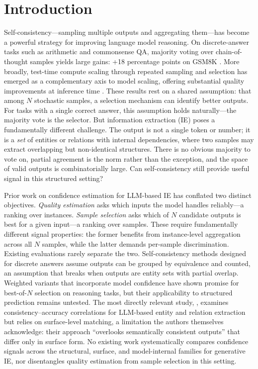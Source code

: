 \section{Introduction}\label{sec:introduction}

Self-consistency---sampling multiple outputs and aggregating them---has become a powerful strategy for improving language model reasoning.
On discrete-answer tasks such as arithmetic and commonsense QA, majority voting over chain-of-thought samples yields large gains: +18 percentage points on GSM8K \cite{wang2023selfconsistency}.
More broadly, test-time compute scaling through repeated sampling and selection has emerged as a complementary axis to model scaling, offering substantial quality improvements at inference time \cite{snell2024scaling, brown2024monkeys}.
These results rest on a shared assumption: that among $N$ stochastic samples, a selection mechanism can identify better outputs.
For tasks with a single correct answer, this assumption holds naturally---the majority vote is the selector.
But information extraction (IE) poses a fundamentally different challenge.
The output is not a single token or number; it is a \textit{set} of entities or relations with internal dependencies, where two samples may extract overlapping but non-identical structures.
There is no obvious majority to vote on, partial agreement is the norm rather than the exception, and the space of valid outputs is combinatorially large.
Can self-consistency still provide useful signal in this structured setting?

Prior work on confidence estimation for LLM-based IE has conflated two distinct objectives.
\textit{Quality estimation} asks which inputs the model handles reliably---a ranking over instances.
\textit{Sample selection} asks which of $N$ candidate outputs is best for a given input---a ranking over samples.
These require fundamentally different signal properties: the former benefits from instance-level aggregation across all $N$ samples, while the latter demands per-sample discrimination.
Existing evaluations rarely separate the two.
Self-consistency methods designed for discrete answers \cite{wang2023selfconsistency, chen2024usc} assume outputs can be grouped by equivalence and counted, an assumption that breaks when outputs are entity sets with partial overlap.
Weighted variants that incorporate model confidence \cite{taubenfeld2025cisc, kang2025selfcertainty} have shown promise for best-of-$N$ selection on reasoning tasks, but their applicability to structured prediction remains untested.
The most directly relevant study, \citet{nedellec2026consistency}, examines consistency--accuracy correlations for LLM-based entity and relation extraction but relies on surface-level matching, a limitation the authors themselves acknowledge: their approach ``overlooks semantically consistent outputs'' that differ only in surface form.
No existing work systematically compares confidence signals across the structural, surface, and model-internal families for generative IE, nor disentangles quality estimation from sample selection in this setting.

